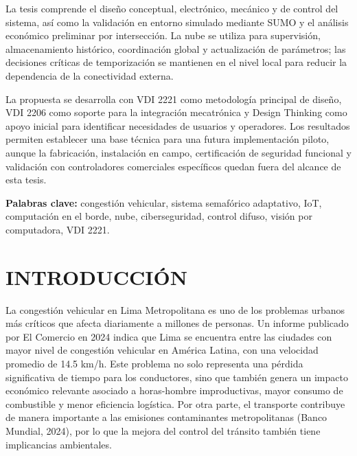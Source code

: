 \documentclass[12pt,a4paper,oneside]{report}
\begin{document}
La tesis comprende el diseño conceptual, electrónico, mecánico y de control del sistema, así como la validación en entorno simulado mediante SUMO y el análisis económico preliminar por intersección. La nube se utiliza para supervisión, almacenamiento histórico, coordinación global y actualización de parámetros; las decisiones críticas de temporización se mantienen en el nivel local para reducir la dependencia de la conectividad externa.

La propuesta se desarrolla con VDI 2221 como metodología principal de diseño, VDI 2206 como soporte para la integración mecatrónica y Design Thinking como apoyo inicial para identificar necesidades de usuarios y operadores. Los resultados permiten establecer una base técnica para una futura implementación piloto, aunque la fabricación, instalación en campo, certificación de seguridad funcional y validación con controladores comerciales específicos quedan fuera del alcance de esta tesis.

\textbf{Palabras clave:} congestión vehicular, sistema semafórico adaptativo, IoT, computación en el borde, nube, ciberseguridad, control difuso, visión por computadora, VDI 2221.

\cleardoublepage
{}
\tableofcontents
\cleardoublepage
{}
\listoffigures
\cleardoublepage
{}
\listoftables
\cleardoublepage
{}
\chapter*{INTRODUCCIÓN}\label{introducciuxf3n}

La congestión vehicular en Lima Metropolitana es uno de los problemas urbanos más críticos que afecta diariamente a millones de personas. Un informe publicado por El Comercio en 2024 indica que Lima se encuentra entre las ciudades con mayor nivel de congestión vehicular en América Latina, con una velocidad promedio de 14.5 km/h. Este problema no solo representa una pérdida significativa de tiempo para los conductores, sino que también genera un impacto económico relevante asociado a horas-hombre improductivas, mayor consumo de combustible y menor eficiencia logística. Por otra parte, el transporte contribuye de manera importante a las emisiones contaminantes metropolitanas (Banco Mundial, 2024), por lo que la mejora del control del tránsito también tiene implicancias ambientales.
\end{document}
